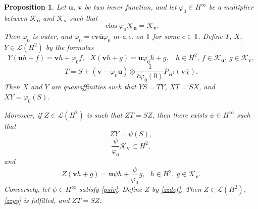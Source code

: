 \documentclass[a4paper,oneside,11pt]{amsart}
\numberwithin{equation}{section}
\theoremstyle{plain}
\newtheorem{proposition}[theorem]{Proposition}
\theoremstyle{definition}
\begin{document}
\begin{proposition}\label{propdeftt} Let $\mathbf u$, $\mathbf v$ be two inner function, and let $\varphi_0\in H^\infty$ 
be a multiplier between $\mathcal K_{\mathbf u}$ and $\mathcal K_{\mathbf v}$ such that  
 \begin{equation}\label{closvarphi0}\operatorname{clos}\varphi_0\mathcal K_{\mathbf u}=\mathcal K_{\mathbf v}.
\end{equation} Then $\varphi_0$ is outer, and 
 $\varphi_0=c{\mathbf v}\overline{\mathbf u}\overline \varphi_0$ $m$-a.e. on $\mathbb T$ for some $c\in\mathbb T$. 
Define $T$, $X$, $Y\in\mathcal L(H^2)$ by the formulas
$$ Y({\mathbf u}h+f)={\mathbf v}h+\varphi_0 f, \ \ \ X({\mathbf v}h+g)={\mathbf u}\varphi_0 h+g, \ \ \ \ h\in H^2, \ f\in \mathcal K_{\mathbf u}, \ 
g\in\mathcal K_{\mathbf v}, $$
$$T=S+({\mathbf v}-\varphi_0{\mathbf u})\otimes\frac{1}{\overline c\varphi_0(0)}P_{H^2}({\mathbf v}\overline\chi).$$
Then $X$ and $Y$ are quasiaffinities such that $YS=TY$, $XT=SX$, and $XY=\varphi_0(S)$. 

Moreover, if $Z\in\mathcal L(H^2)$ is such that $ZT=SZ$, then there exists $\psi\in H^\infty$ such that
\begin{equation}\label{zzyy} ZY=\psi(S),\end{equation} 
\begin{equation}\label{psiv} \frac{\psi}{\varphi_0}\mathcal K_{\mathbf v}\subset H^2,
\end{equation}
and 
\begin{equation}\label{zzdef} Z({\mathbf v}h+g)={\mathbf u}\psi h+\frac{\psi}{\varphi_0}g, 
\ \ \ h\in H^2, \ g\in\mathcal K_{\mathbf v}. 
\end{equation}
Conversely, let $\psi\in H^\infty$  satisfy \eqref{psiv}. Define  $Z$  by \eqref{zzdef}. Then 
 $Z\in\mathcal L(H^2)$, \eqref{zzyy} is fulfilled,  and $ZT=SZ$. 
\end{proposition}
\end{document}
